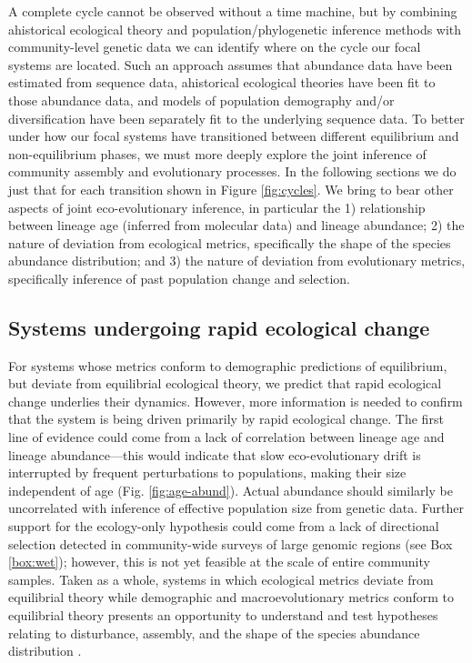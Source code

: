 \documentclass[12pt]{article}
\newcounter{Box}
\begin{document}
A complete cycle cannot be observed without a time machine, but by
combining ahistorical ecological theory and population/phylogenetic
inference methods with community-level genetic data we can identify
where on the cycle our focal systems are located. Such an approach
assumes that abundance data have been estimated from sequence data,
ahistorical ecological theories have been fit to those abundance data,
and models of population demography and/or diversification have been
separately fit to the underlying sequence data. To better under how
our focal systems have transitioned between different equilibrium and
non-equilibrium phases, we must more deeply explore the joint
inference of community assembly and evolutionary processes. In the
following sections we do just that for each transition shown in Figure
\ref{fig:cycles}. We bring to bear other aspects of joint
eco-evolutionary inference, in particular the 1) relationship between
lineage age (inferred from molecular data) and lineage abundance; 2)
the nature of deviation from ecological metrics, specifically the
shape of the species abundance distribution; and 3) the nature of
deviation from evolutionary metrics, specifically inference of past
population change and selection.

\subsection{Systems undergoing rapid ecological change}

For systems whose metrics conform to demographic predictions of
equilibrium, but deviate from equilibrial ecological theory, we
predict that rapid ecological change underlies their
dynamics. However, more information is needed to confirm that the
system is being driven primarily by rapid ecological change. The first
line of evidence could come from a lack of correlation between lineage
age and lineage abundance---this would indicate that slow
eco-evolutionary drift is interrupted by frequent perturbations to
populations, making their size independent of age
(Fig. \ref{fig:age-abund}). Actual abundance should similarly be
uncorrelated with inference of effective population size from genetic
data. Further support for the ecology-only hypothesis could come from
a lack of directional selection detected in community-wide surveys of
large genomic regions (see Box \ref{box:wet}); however, this is not
yet feasible at the scale of entire community samples. Taken as a
whole, systems in which ecological metrics deviate from equilibrial
theory while demographic and macroevolutionary metrics conform to
equilibrial theory presents an opportunity to understand and test
hypotheses relating to disturbance, assembly, and the shape of the
species abundance distribution \citep[e.g.,][]{Harte2011-um}.
\end{document}
